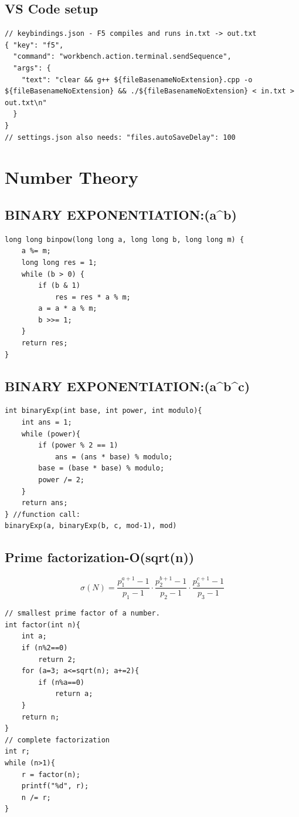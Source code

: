 \subsection{VS Code setup}
\begin{lstlisting}
// keybindings.json - F5 compiles and runs in.txt -> out.txt
{ "key": "f5",
  "command": "workbench.action.terminal.sendSequence",
  "args": {
    "text": "clear && g++ ${fileBasenameNoExtension}.cpp -o ${fileBasenameNoExtension} && ./${fileBasenameNoExtension} < in.txt > out.txt\n"
  }
}
// settings.json also needs: "files.autoSaveDelay": 100
\end{lstlisting}


\section{Number Theory}
\subsection{BINARY EXPONENTIATION:(a\^{}b)}
\begin{lstlisting}
long long binpow(long long a, long long b, long long m) {
    a %= m;
    long long res = 1;
    while (b > 0) {
        if (b & 1)
            res = res * a % m;
        a = a * a % m;
        b >>= 1;
    }
    return res;
}
\end{lstlisting}
\subsection{BINARY EXPONENTIATION:(a\^{}b\^{}c)}
\begin{lstlisting}
int binaryExp(int base, int power, int modulo){
    int ans = 1;
    while (power){
        if (power % 2 == 1)
            ans = (ans * base) % modulo;
        base = (base * base) % modulo;
        power /= 2;
    }
    return ans;
} //function call:
binaryExp(a, binaryExp(b, c, mod-1), mod)
\end{lstlisting}
\subsection{Prime factorization-O(sqrt(n))}
\[\sigma(N)=\frac{p_1^{a+1}-1}{p_1-1}\cdot\frac{p_2^{b+1}-1}{p_2-1}\cdot\frac{p_3^{c+1}-1}{p_3-1}\]
\begin{lstlisting}
// smallest prime factor of a number.
int factor(int n){
    int a;
    if (n%2==0)
        return 2;
    for (a=3; a<=sqrt(n); a+=2){
        if (n%a==0)
            return a;
    }
    return n;
}
// complete factorization
int r;
while (n>1){
    r = factor(n);
    printf("%d", r);
    n /= r;
}
\end{lstlisting}
